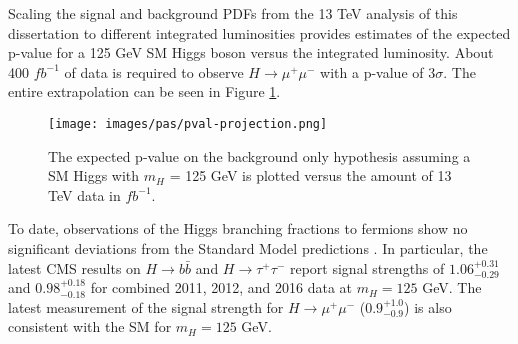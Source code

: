 Scaling the signal and background PDFs from the 13 TeV analysis of this dissertation to different integrated luminosities provides estimates of the expected p-value for a 125 GeV SM Higgs boson versus the integrated luminosity. About 400 $fb^{-1}$ of data is required to observe $H\rightarrow\mu^+\mu^-$ with a p-value of 3$\sigma$. The entire extrapolation can be seen in Figure \ref{fig:pvalprojection}.

\begin{figure}[h!]
    \centering
    \texttt{[image: images/pas/pval-projection.png]}
    \caption[The expected p-value for a 125 GeV SM Higgs boson versus the amount of 13 TeV data.]
    {The expected p-value on the background only hypothesis assuming a SM Higgs with $m_H$ = 125 GeV is plotted versus the amount of 13 TeV data in $fb^{-1}$.}
    \label{fig:pvalprojection}
\end{figure}

To date, observations of the Higgs branching fractions to fermions show no significant deviations from the Standard Model predictions \cite{cmshiggstau2017,cmshiggsbb2017, cmshmumu2017, atlashmumu2017}. In particular, the latest CMS results on $H\rightarrow b\bar{b}$ \cite{cmshiggsbb2017} and $H\rightarrow \tau^+\tau^-$ \cite{cmshiggstau2017} report signal strengths of $1.06^{+0.31}_{-0.29}$ and $0.98^{+0.18}_{-0.18}$ for combined 2011, 2012, and 2016 data at $m_H=125$ GeV. The latest measurement of the signal strength for $H\rightarrow\mu^+\mu^-$ ($0.9^{+1.0}_{-0.9}$) is also consistent with the SM for $m_H=125$ GeV. 

